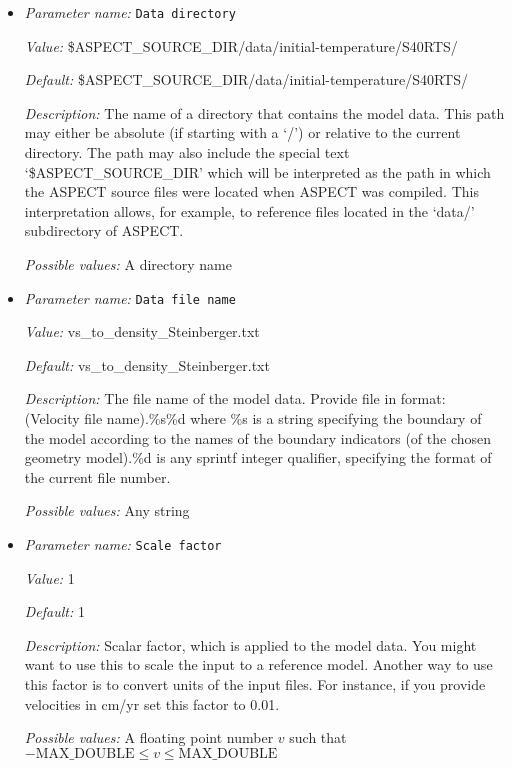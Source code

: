 \begin{itemize}
\item {\it Parameter name:} {\tt Data directory}
\label{parameters:Initial temperature model/SAVANI perturbation/Ascii data vs to density model/Data directory}


{\it Value:} \$ASPECT\_SOURCE\_DIR/data/initial-temperature/S40RTS/


{\it Default:} \$ASPECT\_SOURCE\_DIR/data/initial-temperature/S40RTS/


{\it Description:} The name of a directory that contains the model data. This path may either be absolute (if starting with a `/') or relative to the current directory. The path may also include the special text `\$ASPECT\_SOURCE\_DIR' which will be interpreted as the path in which the ASPECT source files were located when ASPECT was compiled. This interpretation allows, for example, to reference files located in the `data/' subdirectory of ASPECT. 


{\it Possible values:} A directory name
\item {\it Parameter name:} {\tt Data file name}
\label{parameters:Initial temperature model/SAVANI perturbation/Ascii data vs to density model/Data file name}


{\it Value:} vs\_to\_density\_Steinberger.txt


{\it Default:} vs\_to\_density\_Steinberger.txt


{\it Description:} The file name of the model data. Provide file in format: (Velocity file name).\%s\%d where \%s is a string specifying the boundary of the model according to the names of the boundary indicators (of the chosen geometry model).\%d is any sprintf integer qualifier, specifying the format of the current file number. 


{\it Possible values:} Any string
\item {\it Parameter name:} {\tt Scale factor}
\label{parameters:Initial temperature model/SAVANI perturbation/Ascii data vs to density model/Scale factor}


{\it Value:} 1


{\it Default:} 1


{\it Description:} Scalar factor, which is applied to the model data. You might want to use this to scale the input to a reference model. Another way to use this factor is to convert units of the input files. For instance, if you provide velocities in cm/yr set this factor to 0.01.


{\it Possible values:} A floating point number $v$ such that $-\text{MAX\_DOUBLE} \leq v \leq \text{MAX\_DOUBLE}$
\end{itemize}

